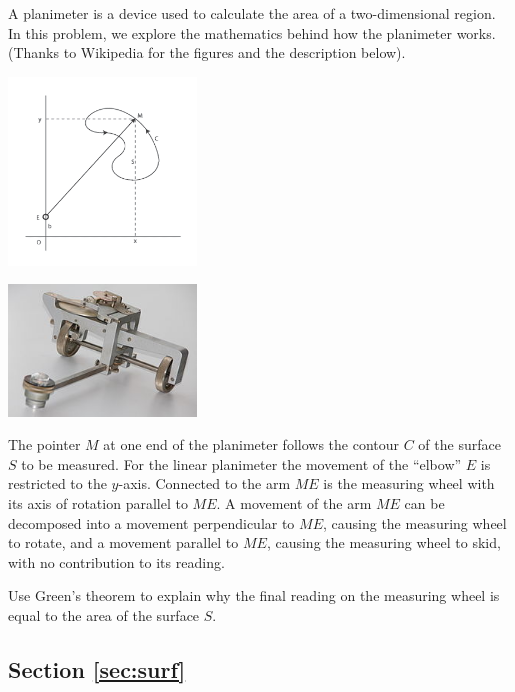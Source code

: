 \documentclass[svgnames]{watsonbook}
\begin{document}
\begin{exercise}{}{}
  A planimeter is a device used to calculate the area of a
  two-dimensional region. In this problem, we explore the mathematics
  behind how the planimeter works. (Thanks to Wikipedia for the
  figures and the description below).

  \begin{center}
    \begin{minipage}{5cm}
      \includegraphics[width=5cm]{exercisefigures/planfig}
    \end{minipage}
    \begin{minipage}{5cm}
      \includegraphics[width=5cm]{exercisefigures/planimeter.jpg}
    \end{minipage}
  \end{center}

  The pointer $M$ at one end of the planimeter follows the contour $C$
  of the surface $S$ to be measured. For the linear planimeter the
  movement of the ``elbow'' $E$ is restricted to the
  $y$-axis. Connected to the arm $ME$ is the measuring wheel with its
  axis of rotation parallel to $ME$. A movement of the arm $ME$ can be
  decomposed into a movement perpendicular to $ME$, causing the
  measuring wheel to rotate, and a movement parallel to $ME$, causing
  the measuring wheel to skid, with no contribution to its reading.

  Use Green's theorem to explain why the final reading on the
  measuring wheel is equal to the area of the surface $S$.
\end{exercise}


\subsection*{Section \ref{sec:surf}}
\end{document}
